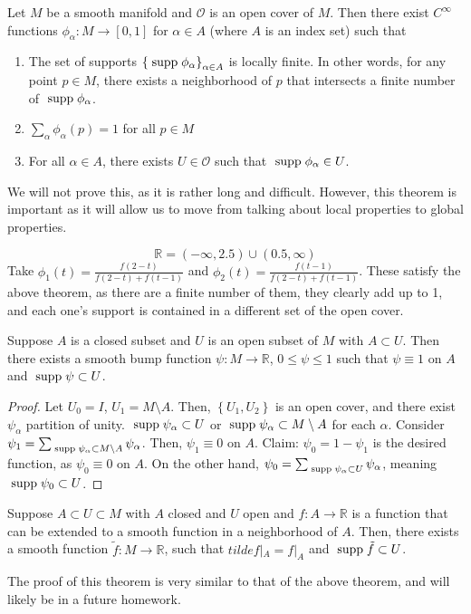 \documentclass{mathnotes}
\begin{document}
\begin{thm}
    Let $M$ be a smooth manifold and $\mathcal{O}$ is an open cover of $M$. Then there exist $C^\infty$ functions $\phi_\alpha:M\to[0,1]$ for
    $\alpha\in A$ (where $A$ is an index set) such that
    \begin{enumerate}
        \item The set of supports $\left\{ \;\textnormal{supp}\;\phi_\alpha \right\}_{\alpha\in A}$ is locally finite. In other words, for any point $p\in M$, there
            exists a neighborhood of $p$ that intersects a finite number of $\;\textnormal{supp}\;\phi_\alpha$.
        \item $\sum_\alpha\phi_\alpha(p)=1$ for all $p\in M$
        \item For all $\alpha\in A$, there exists $U\in\mathcal{O}$ such that $\;\textnormal{supp}\;\phi_\alpha\in U$.
    \end{enumerate}
\end{thm}
We will not prove this, as it is rather long and difficult. However, this theorem is important as it will allow us to move from talking about local
properties to global properties.

\begin{exmp}
    \[\mathbb{R}=(-\infty,2.5)\cup(0.5,\infty)\]
    Take $\phi_1(t)=\frac{f(2-t)}{f(2-t)+f(t-1)}$ and $\phi_2(t)=\frac{f(t-1)}{f(2-t)+f(t-1)}$. These satisfy the above theorem, as there are a finite number of them,
    they clearly add up to 1, and each one's support is contained in a different set of the open cover.
\end{exmp}

\begin{thm}
Suppose $A$ is a closed subset and $U$ is an open subset of $M$ with $A\subset U$. Then there exists a smooth bump function $\psi:M\to\mathbb{R}$,
$0\leq\psi\leq1$ such that $\psi\equiv 1$ on $A$ and $\;\textnormal{supp}\;\psi\subset U$.
\end{thm}
\begin{proof}
    Let $U_0=I$, $U_1=M\setminus A$. Then, $\left\{ U_1,U_2 \right\}$ is an open cover, and there exist $\psi_\alpha$ partition of unity. $\;\textnormal{supp}\;\psi_\alpha\subset U$
    or $\;\textnormal{supp}\;\psi_\alpha\subset M\setminus A$ for each $\alpha$. Consider $\psi_1=\sum_{\;\textnormal{supp}\;\psi_\alpha\subset M\setminus A}\psi_\alpha$. Then, $\psi_1\equiv 0$
    on $A$. Claim: $\psi_0=1-\psi_1$ is the desired function, as $\psi_0\equiv0$ on $A$. On the other hand, $\psi_0=\sum_{\;\textnormal{supp}\;\psi_\alpha\subset U}\psi_\alpha$,
    meaning $\;\textnormal{supp}\;\psi_0\subset U$.
\end{proof}

\begin{thm}
    Suppose $A\subset U\subset M$ with $A$ closed and $U$ open and $f:A\to \mathbb{R}$ is a function that can be extended to a smooth function in a neighborhood of $A$.
    Then, there exists a smooth function $\tilde{f}:M\to\mathbb{R}$, such that $tilde{f}|_A=f|_A$ and $\;\textnormal{supp}\;\tilde{f}\subset U$.
\end{thm}
The proof of this theorem is very similar to that of the above theorem, and will likely be in a future homework.
\end{document}
